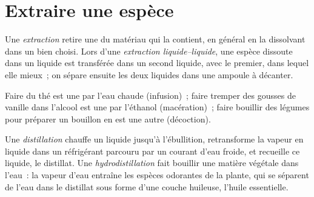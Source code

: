 \section{Extraire une espèce}

\begin{definition}\label{def:g10:chemical-species:extraction}
Une \emph{extraction} retire une  du
matériau qui la contient, en général en la dissolvant dans un 
bien choisi. Lors d'une \emph{extraction liquide--liquide},
une espèce dissoute dans un liquide est transférée dans un second
liquide,  avec le premier, dans lequel elle 
mieux~; on sépare ensuite les deux liquides dans une ampoule à décanter.
\end{definition}

\begin{example}\label{ex:g10:chemical-species:everyday}
Faire du thé est une  par l'eau chaude (infusion)~; faire
tremper des gousses de vanille dans l'alcool est une  par
l'éthanol (macération)~; faire bouillir des légumes pour préparer un
bouillon en est une autre (décoction).
\end{example}


\begin{definition}\label{def:g10:chemical-species:distillation}
Une \emph{distillation} chauffe un  liquide
jusqu'à l'ébullition, retransforme la vapeur en liquide dans un
réfrigérant parcouru par un courant d'eau froide, et recueille ce
liquide, le distillat. Une \emph{hydrodistillation}
fait bouillir une matière végétale dans l'eau~: la vapeur d'eau entraîne
les espèces odorantes de la plante, qui se séparent de l'eau dans le
distillat sous forme d'une couche huileuse, l'huile essentielle.
\end{definition}

